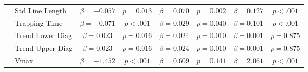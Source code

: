 \begin{tabular}{llcc|cc|cc}
 & Std Line Length & $\beta = -0.057$ & $p = 0.013$ & $\beta = 0.070$ & $p = 0.002$ & $\beta = 0.127$ & $p < .001$ \\
 & Trapping Time & $\beta = -0.071$ & $p < .001$ & $\beta = 0.029$ & $p = 0.040$ & $\beta = 0.101$ & $p < .001$ \\
 & Trend Lower Diag & $\beta = 0.023$ & $p = 0.016$ & $\beta = 0.024$ & $p = 0.010$ & $\beta = 0.001$ & $p = 0.875$ \\
 & Trend Upper Diag & $\beta = 0.023$ & $p = 0.016$ & $\beta = 0.024$ & $p = 0.010$ & $\beta = 0.001$ & $p = 0.875$ \\
 & Vmax & $\beta = -1.452$ & $p < .001$ & $\beta = 0.609$ & $p = 0.141$ & $\beta = 2.061$ & $p < .001$ \\
\midrule
\bottomrule
\end{tabular}